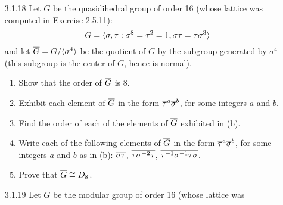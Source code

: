 \begin{enumerate}
\begin{enumerate}
               appropriate integers $a$ and $b$, it follows that
               $$X = \cyc{x, y : x^4 = y^2 = 1, yx = x^{-1}y} \cong D_8.$$
         \item By Exercise 2.2.7(b), $Z(D_8) = \cyc{r^2}$. Thus since
               $\m{G} \cong D_8$ (see (b)), it follows that
               $Z(\m{G}) = \cyc{\m{r}^2}$. Thus
               $$\m{G}/Z(\m{G}) = \{Z(\m{G}), \m{r}Z(\m{G}), \m{s}Z(\m{G}),
                 \m{sr}Z(\m{G})\}.$$
               The order of each nonidentity element in the preceding set is 2;
               conclude by Exercise 2.5.10 that $\m{G}/Z(\m{G})$ is isomorphic
               to the Klein 4-group.
               \qed
      \end{enumerate}
   \item[3.1.18]  Let $G$ be the quasidihedral group of order 16 (whose lattice
                  was computed in Exercise 2.5.11):
                  $$G = \langle \sigma, \tau : \sigma^8 = \tau^2 = 1,
                             \sigma\tau = \tau\sigma^3 \rangle$$
                  and let $\overline{G} = G/\langle \sigma^4 \rangle$ be the quotient of $G$ by
                  the subgroup generated by $\sigma^4$ (this subgroup is the
                  center of $G$, hence is normal).
                  \begin{enumerate}
                     \item Show that the order of $\overline{G}$ is 8.
                     \item Exhibit each element of $\overline{G}$ in the form
                           $\overline{\tau}^a\overline{\sigma}^b$, for some integers $a$ and
                           $b$.
                     \item Find the order of each of the elements of $\overline{G}$
                           exhibited in (b).
                     \item Write each of the following elements of $\overline{G}$ in
                           the form $\overline{\tau}^a\overline{\sigma}^b$, for some integers
                           $a$ and $b$ as in (b): \quad $\overline{\sigma\tau}$, \quad
                           $\overline{\tau\sigma^{-2}\tau}$, \quad
                           $\overline{\tau^{-1}\sigma^{-1}\tau\sigma}$.
                     \item Prove that $\m{G} \cong D_8$.
                  \end{enumerate}
   \item[3.1.19]  Let $G$ be the modular group of order 16 (whose lattice was

\end{enumerate}
